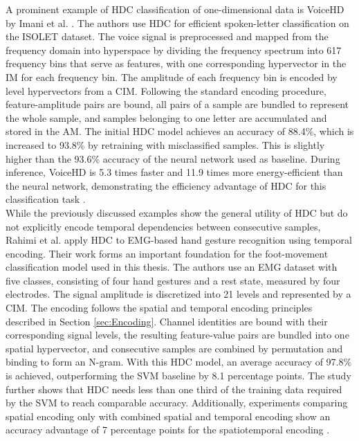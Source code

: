         A prominent example of HDC classification of one-dimensional data is VoiceHD by Imani et al. \cite{imani_voicehd_2017}. The authors use HDC for efficient spoken-letter classification on the ISOLET dataset. The voice signal is preprocessed and mapped from the frequency domain into hyperspace by dividing the frequency spectrum into 617 frequency bins that serve as features, with one corresponding hypervector in the IM for each frequency bin. The amplitude of each frequency bin is encoded by level hypervectors from a \ac{CIM}. Following the standard encoding procedure, feature-amplitude pairs are bound, all pairs of a sample are bundled to represent the whole sample, and samples belonging to one letter are accumulated and stored in the \ac{AM}.
        The initial HDC model achieves an accuracy of 88.4\%, which is increased to 93.8\% by retraining with misclassified samples. This is slightly higher than the 93.6\% accuracy of the neural network used as baseline. During inference, VoiceHD is 5.3 times faster and 11.9 times more energy-efficient than the neural network, demonstrating the efficiency advantage of HDC for this classification task \cite{imani_voicehd_2017}.\\
       
        While the previously discussed examples show the general utility of HDC but do not explicitly encode temporal dependencies between consecutive samples, Rahimi et al. \cite{rahimi_hyperdimensional_2016} apply HDC to EMG-based hand gesture recognition using temporal encoding. Their work forms an important foundation for the foot-movement classification model used in this thesis. 
        The authors use an EMG dataset with five classes, consisting of four hand gestures and a rest state, measured by four electrodes. The signal amplitude is discretized into 21 levels and represented by a \ac{CIM}. The encoding follows the spatial and temporal encoding principles described in Section \ref{sec:Encoding}. Channel identities are bound with their corresponding signal levels, the resulting feature-value pairs are bundled into one spatial hypervector, and consecutive samples are combined by permutation and binding to form an N-gram.
        With this HDC model, an average accuracy of  97.8\% is achieved, outperforming the SVM baseline by 8.1 percentage points. The study further shows that HDC needs less than one third of the training data required by the \ac{SVM} to reach comparable accuracy. Additionally, experiments comparing spatial encoding only with combined spatial and temporal encoding show an accuracy advantage of 7 percentage points for the spatiotemporal encoding \cite{rahimi_hyperdimensional_2016}.\\
        
